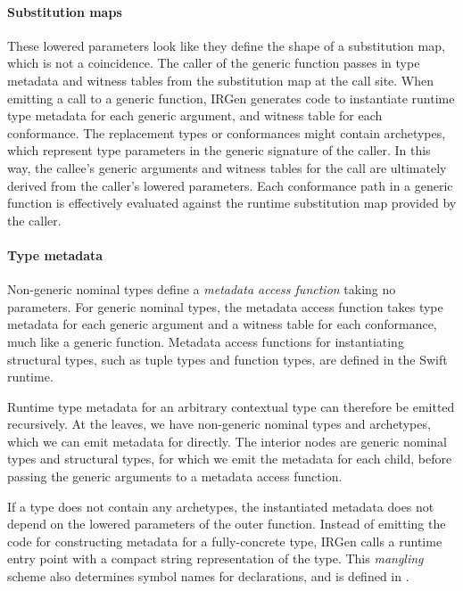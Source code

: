 \documentclass[../generics]{subfiles}
\begin{document}
\paragraph{Substitution maps}
These lowered parameters look like they define the shape of a substitution map, which is not a coincidence. The caller of the generic function passes in type metadata and witness tables from the substitution map at the call site. When emitting a call to a generic function, IRGen generates code to instantiate runtime type metadata for each generic argument, and witness table for each conformance. The replacement types or conformances might contain archetypes, which represent type parameters in the generic signature of the caller. In this way, the callee's generic arguments and witness tables for the call are ultimately derived from the caller's lowered parameters. Each conformance path in a generic function is effectively evaluated against the runtime substitution map provided by the caller.

\paragraph{Type metadata}
Non-generic nominal types define a \emph{metadata access function} taking no parameters. For generic nominal types, the metadata access function takes type metadata for each generic argument and a witness table for each conformance, much like a generic function. Metadata access functions for instantiating structural types, such as tuple types and function types, are defined in the Swift runtime.

Runtime type metadata for an arbitrary contextual type can therefore be emitted recursively. At the leaves, we have non-generic nominal types and archetypes, which we can emit metadata for directly. The interior nodes are generic nominal types and structural types, for which we emit the metadata for each child, before passing the generic arguments to a metadata access function.

If a type does not contain any archetypes, the instantiated metadata does not depend on the lowered parameters of the outer function. Instead of emitting the code for constructing metadata for a fully-concrete type, IRGen calls a runtime entry point with a compact string representation of the type. This \emph{mangling} scheme also determines symbol names for declarations, and is defined in \cite{mangling}.
\end{document}
